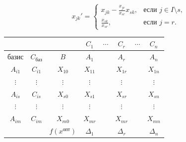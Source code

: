 \documentclass[17pt]{extarticle}
\begin{document}
\[
    x_{jk}' =
    \begin{cases}
        x_{jk} - \frac{x_{jr}}{x_{sr}} x_{sk}, & \text{если } j \in I \setminus s, \\
        \frac{x_{sk}}{x_{sr}},                 & \text{если } j = r.
    \end{cases}
\]

\begin{tabular}{|c|c|c|c|c|c|c|c|}
    \hline
                 &                      &                         & \( C_1 \)      & \(\cdots\) & \( C_r \)      & \(\cdots\) & \( C_n \)      \\
    \hline
    базис        & \( C_{\text{баз}} \) & \( B \)                 & \( A_1 \)      &            & \( A_r \)      &            & \( A_n \)      \\
    \hline
    \( A_{i1} \) & \( C_{i1} \)         & \( X_{10} \)            & \( X_{11} \)   &            & \( X_{1r} \)   &            & \( X_{1n} \)   \\
    \hline
    \(\vdots\)   & \(\vdots\)           & \(\vdots\)              & \(\vdots\)     &            & \(\vdots\)     &            & \(\vdots\)     \\
    \hline
    \( A_{is} \) & \( C_{is} \)         & \( X_{s0} \)            & \( X_{s1} \)   &            & \( X_{sr} \)   &            & \( X_{sn} \)   \\
    \hline
    \(\vdots\)   & \(\vdots\)           & \(\vdots\)              & \(\vdots\)     &            & \(\vdots\)     &            & \(\vdots\)     \\
    \hline
    \( A_{im} \) & \( C_{im} \)         & \( X_{m0} \)            & \( X_{mr} \)   &            & \( X_{mr} \)   &            & \( X_{mn} \)   \\
    \hline
                 &                      & \( f(x^{\text{опт}}) \) & \( \Delta_1 \) &            & \( \Delta_r \) &            & \( \Delta_n \) \\
    \hline
\end{tabular}
\end{document}
